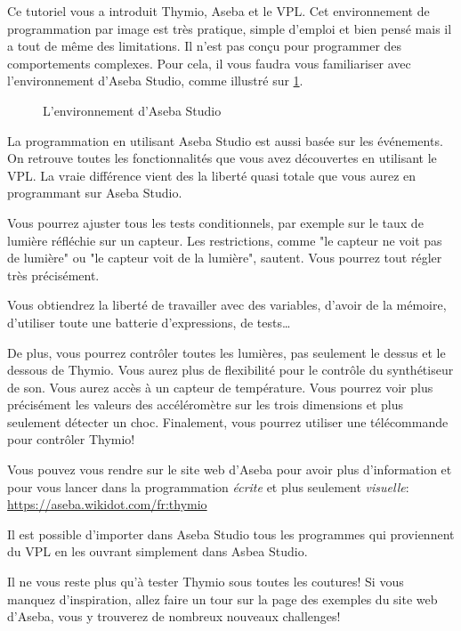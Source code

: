 
Ce tutoriel vous a introduit Thymio, Aseba et le VPL. Cet environnement de programmation par image est très pratique, simple d'emploi et bien pensé mais il a tout de même des limitations. Il n'est pas conçu pour programmer des comportements complexes. Pour cela, il vous faudra vous familiariser avec l'environnement d'Aseba Studio, comme illustré sur \cref{fig.Aseba_general}.

\begin{figure}[hbt]
\begin{center}
\caption{L'environnement d'Aseba Studio}\label{fig.Aseba_general}
\end{center}
\end{figure}

La programmation en utilisant Aseba Studio est aussi basée sur les événements. On retrouve toutes les fonctionnalités que vous avez découvertes en utilisant le VPL. La vraie différence vient des la liberté quasi totale que vous aurez en programmant sur Aseba Studio.

Vous pourrez ajuster tous les tests conditionnels, par exemple sur le taux de lumière réfléchie sur un capteur. Les restrictions, comme "le capteur ne voit pas de lumière" ou "le capteur voit de la lumière", sautent. Vous pourrez tout régler très précisément.

Vous obtiendrez la liberté de travailler avec des variables, d'avoir de la mémoire, d'utiliser toute une batterie d'expressions, de tests\ldots

De plus, vous pourrez contrôler toutes les lumières, pas seulement le dessus et le dessous de Thymio. Vous aurez plus de flexibilité pour le contrôle du synthétiseur de son. Vous aurez accès à un capteur de température. Vous pourrez voir plus précisément les valeurs des accéléromètre sur les trois dimensions et plus seulement détecter un choc. Finalement, vous pourrez utiliser une télécommande pour contrôler Thymio!

Vous pouvez vous rendre sur le site web d'Aseba pour avoir plus d'information et pour vous lancer dans la programmation \textit{écrite} et plus seulement \textit{visuelle}: \url{https://aseba.wikidot.com/fr:thymio}

Il est possible d'importer dans Aseba Studio tous les programmes qui proviennent du VPL en les ouvrant simplement dans Asbea Studio.

Il ne vous reste plus qu'à tester Thymio sous toutes les coutures! Si vous manquez d'inspiration, allez faire un tour sur la page des exemples du site web d'Aseba, vous y trouverez de nombreux nouveaux challenges!

\begin{figure}[h]
\begin{center}
\end{center}
\end{figure}